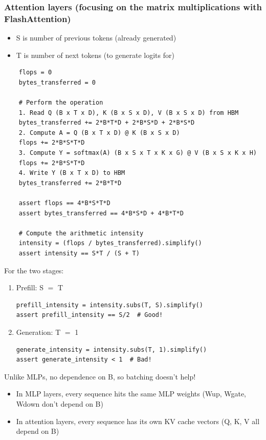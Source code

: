 \documentclass[12pt,twoside]{article}
\begin{document}
\subsubsection*{Attention layers (focusing on the matrix multiplications with FlashAttention)}

\begin{itemize}
    \item S is number of previous tokens (already generated)
    \item T is number of next tokens (to generate logits for)
\end{itemize}

\begin{verbatim}
    flops = 0
    bytes_transferred = 0
    
    # Perform the operation
    1. Read Q (B x T x D), K (B x S x D), V (B x S x D) from HBM
    bytes_transferred += 2*B*T*D + 2*B*S*D + 2*B*S*D
    2. Compute A = Q (B x T x D) @ K (B x S x D)
    flops += 2*B*S*T*D
    3. Compute Y = softmax(A) (B x S x T x K x G) @ V (B x S x K x H)
    flops += 2*B*S*T*D
    4. Write Y (B x T x D) to HBM
    bytes_transferred += 2*B*T*D
    
    assert flops == 4*B*S*T*D
    assert bytes_transferred == 4*B*S*D + 4*B*T*D
    
    # Compute the arithmetic intensity
    intensity = (flops / bytes_transferred).simplify()  
    assert intensity == S*T / (S + T)
\end{verbatim}

For the two stages:
\begin{enumerate}
    \item Prefill: S \(=\) T
\begin{verbatim}
prefill_intensity = intensity.subs(T, S).simplify() 
assert prefill_intensity == S/2  # Good!
\end{verbatim}
    \item Generation: T \(=\) 1
\begin{verbatim}
generate_intensity = intensity.subs(T, 1).simplify()
assert generate_intensity < 1  # Bad!
\end{verbatim}
\end{enumerate}

Unlike MLPs, no dependence on B, so batching doesn't help!
\begin{itemize}
    \item In MLP layers, every sequence hits the same MLP weights (Wup, Wgate, Wdown don't depend on B)
    \item In attention layers, every sequence has its own KV cache vectors (Q, K, V all depend on B)
\end{itemize}
\end{document}
